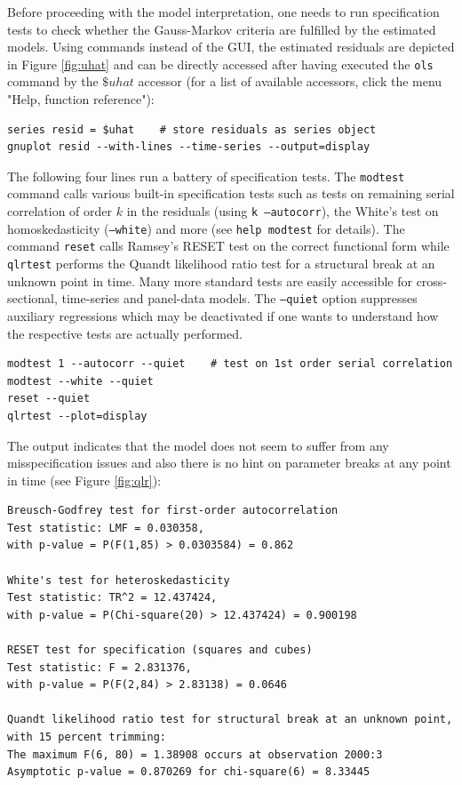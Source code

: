 \documentclass[11pt]{article}
\begin{document}
Before proceeding with the model interpretation, one needs to run specification tests to check whether the Gauss-Markov criteria are fulfilled by the estimated models. Using commands instead of the GUI, the estimated residuals are depicted in Figure \ref{fig:uhat} and can be directly accessed after having executed the \texttt{ols} command by the $ \$uhat $ accessor (for a list of available accessors, click the menu "Help, function reference"):
\begin{Verbatim}[baselinestretch=0.75]
series resid = $uhat	# store residuals as series object
gnuplot resid --with-lines --time-series --output=display
\end{Verbatim}

The following four lines run a battery of specification tests. The \texttt{modtest} command calls various built-in specification tests such as tests on remaining serial correlation of order $ k $ in the residuals (using \texttt{k ---autocorr}), the White's test on homoskedasticity (\texttt{---white}) and more (see \texttt{help modtest} for details). The command \texttt{reset} calls Ramsey's RESET test on the correct functional form while \texttt{qlrtest} performs the Quandt likelihood ratio test for a structural break at an unknown point in time. Many more standard tests are easily accessible for cross-sectional, time-series and panel-data models. The \texttt{---quiet} option suppresses auxiliary regressions which may be deactivated if one wants to understand how the respective tests are actually performed.

\begin{Verbatim}[baselinestretch=0.75]
modtest 1 --autocorr --quiet	# test on 1st order serial correlation
modtest --white --quiet
reset --quiet
qlrtest --plot=display
\end{Verbatim}

The output indicates that the model does not seem to suffer from any misspecification issues and also there is no hint on parameter breaks at any point in time (see Figure \ref{fig:qlr}):

\begin{Verbatim}[baselinestretch=0.75]
Breusch-Godfrey test for first-order autocorrelation
Test statistic: LMF = 0.030358,
with p-value = P(F(1,85) > 0.0303584) = 0.862

White's test for heteroskedasticity
Test statistic: TR^2 = 12.437424,
with p-value = P(Chi-square(20) > 12.437424) = 0.900198

RESET test for specification (squares and cubes)
Test statistic: F = 2.831376,
with p-value = P(F(2,84) > 2.83138) = 0.0646

Quandt likelihood ratio test for structural break at an unknown point,
with 15 percent trimming:
The maximum F(6, 80) = 1.38908 occurs at observation 2000:3
Asymptotic p-value = 0.870269 for chi-square(6) = 8.33445
\end{Verbatim}
\end{document}
